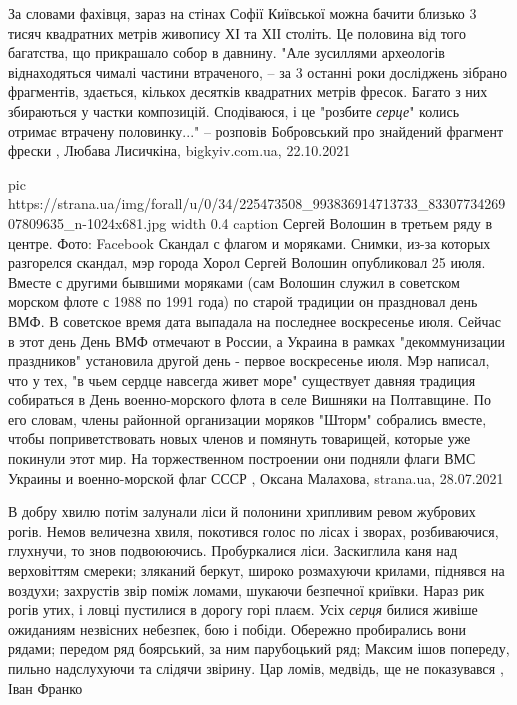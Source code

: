 За словами фахівця, зараз на стінах Софії Київської можна бачити близько 3
тисяч квадратних метрів живопису ХІ та ХІІ століть. Це половина від того
багатства, що прикрашало собор в давнину.  "Але зусиллями археологів
віднаходяться чималі частини втраченого, – за 3 останні роки досліджень зібрано
фрагментів, здається, кількох десятків квадратних метрів фресок. Багато з них
збираються у частки композицій.  Сподіваюся, і це "розбите \emph{серце}" колись
отримає втрачену половинку..." – розповів Бобровський про знайдений фрагмент
фрески
, 
Любава Лисичкіна, bigkyiv.com.ua, 22.10.2021


\ifcmt
  pic https://strana.ua/img/forall/u/0/34/225473508_993836914713733_8330773426907809635_n-1024x681.jpg
  width 0.4
	caption Сергей Волошин в третьем ряду в центре. Фото: Facebook
\fi
Скандал с флагом и моряками.  Снимки, из-за которых разгорелся скандал, мэр
города Хорол Сергей Волошин опубликовал 25 июля. Вместе с другими бывшими
моряками (сам Волошин служил в советском морском флоте с 1988 по 1991 года) по
старой традиции он праздновал день ВМФ.  В советское время дата выпадала на
последнее воскресенье июля. Сейчас в этот день День ВМФ отмечают в России, а
Украина в рамках "декоммунизации праздников" установила другой день - первое
воскресенье июля.  Мэр написал, что у тех, "в чьем сердце навсегда живет море"
существует давняя традиция собираться в День военно-морского флота в селе
Вишняки на Полтавщине.  По его словам, члены районной организации моряков
"Шторм" собрались вместе, чтобы поприветствовать новых членов и помянуть
товарищей, которые уже покинули этот мир.  На торжественном построении они
подняли флаги ВМС Украины и военно-морской флаг СССР
, 
Оксана Малахова, strana.ua, 28.07.2021

В добру хвилю потім залунали ліси й полонини хрипливим ревом жубрових рогів.
Немов величезна хвиля, покотився голос по лісах і зворах, розбиваючися,
глухнучи, то знов подвоюючись. Пробуркалися ліси. Заскиглила каня над
верховіттям смереки; зляканий беркут, широко розмахуючи крилами, піднявся на
воздухи; захрустів звір поміж ломами, шукаючи безпечної криївки. Нараз рик
рогів утих, і ловці пустилися в дорогу горі плаєм. Усіх \emph{серця} билися живіше
ожиданиям незвісних небезпек, бою і побіди. Обережно пробирались вони рядами;
передом ряд боярський, за ним парубоцький ряд; Максим ішов попереду, пильно
надслухуючи та слідячи звірину. Цар ломів, медвідь, ще не показувався
, Іван Франко
